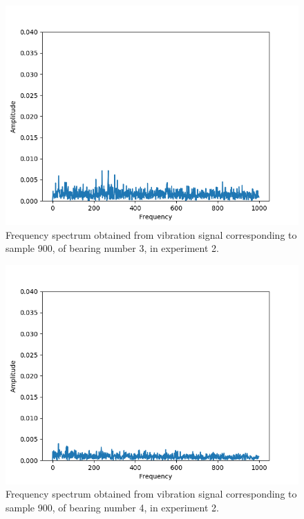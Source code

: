 \documentclass[../Main/thesis.tex]{subfiles}
\begin{document}
\begin{figure}[H] 
   \centering
   \includegraphics[width=6in]{../fig/experiment2_bearing3_fft.png} 
   \caption{Frequency spectrum obtained from vibration signal corresponding to sample 900, of bearing number 3, in experiment 2.}
   \label{fig:bearing3-experiment2-fft}
\end{figure}

\begin{figure}[H] 
   \centering
   \includegraphics[width=6in]{../fig/experiment2_bearing4_fft.png} 
   \caption{Frequency spectrum obtained from vibration signal corresponding to sample 900, of bearing number 4, in experiment 2.}
   \label{fig:bearing4-experiment2-fft}
\end{figure}
























\blankpage
\end{document}
